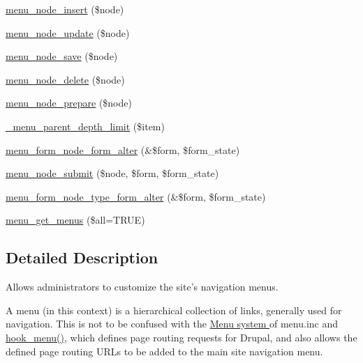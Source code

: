 \begin{DoxyCompactItemize}
\item 
\hyperlink{menu_8module_aa418eadf4430964d4a4c14c6a52f5f5b}{menu\_\-node\_\-insert} (\$node)
\item 
\hyperlink{menu_8module_ae4a25e256ee4473d4ed7a5f783b1b42d}{menu\_\-node\_\-update} (\$node)
\item 
\hyperlink{menu_8module_a8d7834b73f1a9d55e4bc705b6fca3fbf}{menu\_\-node\_\-save} (\$node)
\item 
\hyperlink{menu_8module_a3a81aa02940c4d759f2a63f008782421}{menu\_\-node\_\-delete} (\$node)
\item 
\hyperlink{menu_8module_aa61d00657e2f5efac6e157ad14dff4bb}{menu\_\-node\_\-prepare} (\$node)
\item 
\hyperlink{menu_8module_ad1060ea589cdf66e750f4d82ec37cf6b}{\_\-menu\_\-parent\_\-depth\_\-limit} (\$item)
\item 
\hyperlink{menu_8module_aca38a3b6e6e0bc466ef011a0ed9d5cec}{menu\_\-form\_\-node\_\-form\_\-alter} (\&\$form, \$form\_\-state)
\item 
\hyperlink{menu_8module_a4654aaf42337b6e11074ab43abc66049}{menu\_\-node\_\-submit} (\$node, \$form, \$form\_\-state)
\item 
\hyperlink{menu_8module_a3f04aba48cd2428c9e59333ccaa963e8}{menu\_\-form\_\-node\_\-type\_\-form\_\-alter} (\&\$form, \$form\_\-state)
\item 
\hyperlink{menu_8module_a25bb9c595512dd1485c988e268407845}{menu\_\-get\_\-menus} (\$all=TRUE)
\end{DoxyCompactItemize}


\subsection{Detailed Description}
Allows administrators to customize the site's navigation menus.

A menu (in this context) is a hierarchical collection of links, generally used for navigation. This is not to be confused with the \hyperlink{group__menu}{Menu system } of menu.inc and \hyperlink{group__hooks_ga5c95244fea59b25666e409759e133ded}{hook\_\-menu()}, which defines page routing requests for Drupal, and also allows the defined page routing URLs to be added to the main site navigation menu. 

